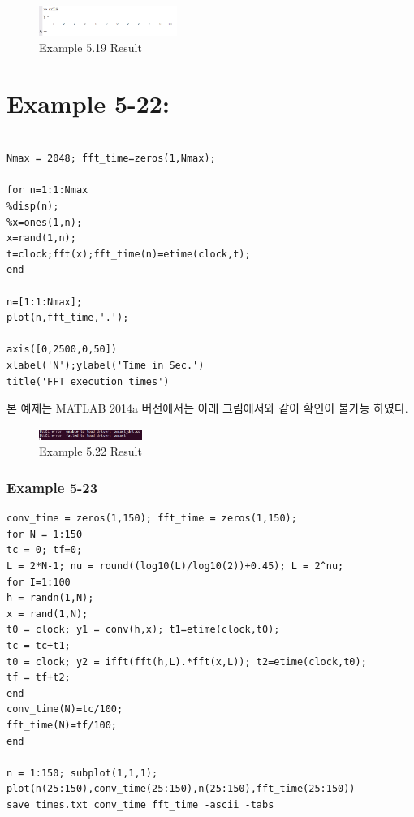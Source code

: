 \documentclass[11pt
  , a4paper
  , article
  , oneside
]{memoir}
\begin{document}
\begin{figure}[h!]
	\centering
	\includegraphics[width=0.4\textwidth,height=0.2\textwidth]{./images/ex519.png}
	\caption{Example 5.19 Result}
	\label{fig:Example 5.19 Result}
\end{figure}

\chapter{Example 5-22:}
\begin{lstlisting}[style=termstyle]
% Example 5.22

Nmax = 2048; fft_time=zeros(1,Nmax);

for n=1:1:Nmax
%disp(n);
%x=ones(1,n);
x=rand(1,n);
t=clock;fft(x);fft_time(n)=etime(clock,t);
end

n=[1:1:Nmax];
plot(n,fft_time,'.');

axis([0,2500,0,50])
xlabel('N');ylabel('Time in Sec.')
title('FFT execution times')
\end{lstlisting}

본 예제는 MATLAB 2014a 버전에서는 아래 그림에서와 같이 확인이 불가능 하였다.

\begin{figure}[h!]
	\centering
	\includegraphics[width=0.3\textwidth,height=0.06\textwidth]{./images/ex522.png}
	\caption{Example 5.22 Result}
	\label{fig:Example 5.22 Result}
\end{figure}

\subsection{Example 5-23}
\begin{lstlisting}[style=termstyle]
% Example 5.23
conv_time = zeros(1,150); fft_time = zeros(1,150);
for N = 1:150
tc = 0; tf=0;
L = 2*N-1; nu = round((log10(L)/log10(2))+0.45); L = 2^nu;
for I=1:100
h = randn(1,N);
x = rand(1,N);
t0 = clock; y1 = conv(h,x); t1=etime(clock,t0);
tc = tc+t1;
t0 = clock; y2 = ifft(fft(h,L).*fft(x,L)); t2=etime(clock,t0);
tf = tf+t2;
end
conv_time(N)=tc/100;
fft_time(N)=tf/100;
end

n = 1:150; subplot(1,1,1);
plot(n(25:150),conv_time(25:150),n(25:150),fft_time(25:150))
save times.txt conv_time fft_time -ascii -tabs
\end{lstlisting}
\end{document}
